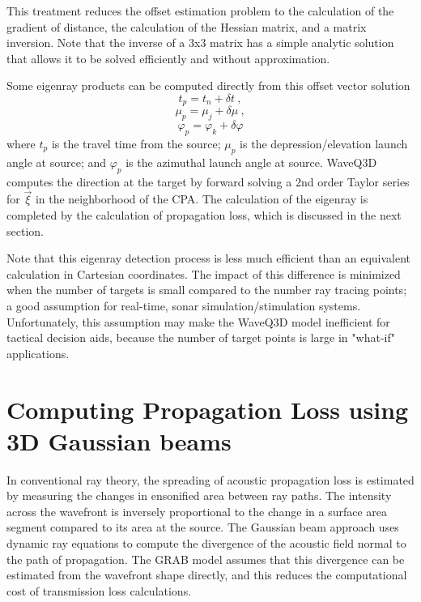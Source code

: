 \documentclass{ws-jca}
\newcommand{\threeD}{3\nobreakdash\textendash D }	%
\begin{document}
This treatment reduces the offset estimation problem to the calculation of
the gradient of distance, the calculation of the Hessian matrix, and a
matrix inversion. Note that the inverse of a 3x3 matrix has a simple
analytic solution that allows it to be solved efficiently and without
approximation.

Some eigenray products can be computed directly from this offset vector
solution
\begin{equation}
	t_p = t_n + \delta t \:,
	\label{eq:delta_t}
\end{equation}
\begin{equation}
	\mu_p = \mu_j + \delta \mu \:,
	\label{eq:delta_mu}
\end{equation}
\begin{equation}
	\varphi_p = \varphi_k + \delta \varphi
	\label{eq:delta_varphi}
\end{equation}
where 
\(t_p\) is the travel time from the source;
\(\mu_p\) is the depression/elevation launch angle at source; and
\(\varphi_p\) is the azimuthal launch angle at source.
WaveQ3D computes the direction at the target  by forward solving a 2nd
order Taylor series for \(\vec\xi\) in the neighborhood of the CPA.  
The calculation of the eigenray is completed by the calculation of propagation loss, which is discussed in the next section.

Note that this eigenray detection process is less much efficient than an equivalent
calculation in Cartesian coordinates. The impact of this
difference is minimized when the number of targets is small compared to the
number ray tracing points; a good assumption for real-time, sonar
simulation/stimulation systems. Unfortunately, this assumption may make the WaveQ3D model
inefficient for tactical decision aids, because the number of target points
is large in "what-if" applications.

\section{Computing Propagation Loss using \threeD Gaussian beams}

In conventional ray theory, the spreading of acoustic propagation loss is estimated by
measuring the changes in ensonified area between ray paths. The intensity
across the wavefront is inversely proportional to the change in a surface
area segment compared to its area at the source. The Gaussian beam approach uses
dynamic ray equations to compute the divergence of the acoustic field
normal to the path of propagation. 
The GRAB model assumes that this divergence can be estimated from the wavefront
shape directly, and this reduces the computational cost of transmission loss calculations.
\end{document}
